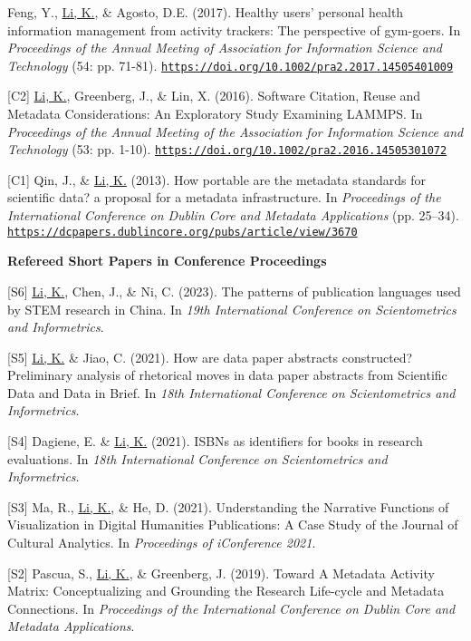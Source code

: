 \documentclass[margin, 10pt]{res} %
\begin{document}
\begin{resume}
[C3] Feng, Y., \underline{Li, K.}, \& Agosto, D.E. (2017). Healthy users’ personal health information management from activity trackers: The perspective of gym-goers. In \textit{Proceedings of the Annual Meeting of Association for Information Science and Technology} (54: pp. 71-81). \href{https://doi.org/10.1002/pra2.2017.14505401009}{\nolinkurl{https://doi.org/10.1002/pra2.2017.14505401009}}

[C2] \underline{Li, K.}, Greenberg, J., \& Lin, X. (2016). Software Citation, Reuse and Metadata Considerations: An Exploratory Study Examining LAMMPS. In \textit{Proceedings of the Annual Meeting of the Association for Information Science and Technology} (53: pp. 1-10). \href{https://doi.org/10.1002/pra2.2016.14505301072}{\nolinkurl{https://doi.org/10.1002/pra2.2016.14505301072}}

[C1] Qin, J., \& \underline{Li, K.} (2013). How portable are the metadata standards for scientific data? a proposal for a metadata infrastructure. In \textit{Proceedings of the International Conference on Dublin Core and Metadata Applications} (pp. 25–34). \href{https://dcpapers.dublincore.org/pubs/article/view/3670}{\nolinkurl{https://dcpapers.dublincore.org/pubs/article/view/3670}}

\textbf{Refereed Short Papers in Conference Proceedings}

[S6] \underline{Li, K.}, Chen, J., \& Ni, C. (2023). The patterns of publication languages used by STEM research in China. In \textit{19th International Conference on Scientometrics and Informetrics}.

[S5] \underline{Li, K.} \& Jiao, C. (2021). How are data paper abstracts constructed? Preliminary analysis of rhetorical moves in data paper abstracts from Scientific Data and Data in Brief. In \textit{18th International Conference on Scientometrics and Informetrics}.

[S4] Dagiene, E. \& \underline{Li, K.} (2021). ISBNs as identifiers for books in research evaluations. In \textit{18th International Conference on Scientometrics and Informetrics}.

[S3] Ma, R., \underline{Li, K.}, \& He, D. (2021). Understanding the Narrative Functions of Visualization in Digital Humanities Publications: A Case Study of the Journal of Cultural Analytics. In \textit{Proceedings of iConference 2021}.

[S2] Pascua, S., \underline{Li, K.}, \& Greenberg, J. (2019). Toward A Metadata Activity Matrix: Conceptualizing and Grounding the Research Life-cycle and Metadata Connections. In \textit{Proceedings of the International Conference on Dublin Core and Metadata Applications}.


\end{resume}
\end{document}

